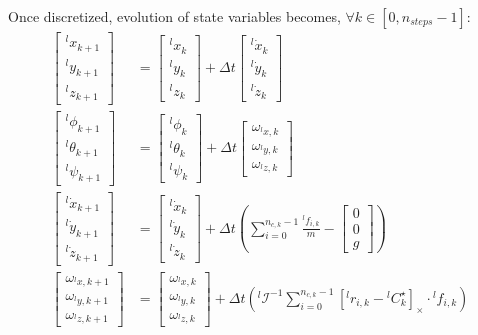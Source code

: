 \documentclass[a4paper,11pt]{article}
\begin{document}
Once discretized, evolution of state variables becomes, $\forall k \in [0, n_{steps}-1]$:
\begin{align}
\begin{bmatrix} {}^l\! x_{k+1} \\ {}^l\! y_{k+1} \\ {}^l\! z_{k+1} \end{bmatrix} &= \begin{bmatrix} {}^l\! x_{k} \\ {}^l\! y_{k} \\ {}^l\! z_{k} \end{bmatrix} + \Delta t \begin{bmatrix} {}^l\! \dot x_{k} \\ {}^l\! \dot y_{k} \\ {}^l\! \dot z_{k} \end{bmatrix} \\
\begin{bmatrix} {}^l\! \phi_{k+1} \\ {}^l\! \theta_{k+1} \\ {}^l\! \psi_{k+1} \end{bmatrix} &= \begin{bmatrix} {}^l\! \phi_{k} \\ {}^l\! \theta_{k} \\ {}^l\! \psi_{k} \end{bmatrix} + \Delta t \begin{bmatrix}  \omega_{{}^l\!x,k} \\  \omega_{{}^l\!y,k} \\ \omega_{{}^l\! z,k} \end{bmatrix} \\
\begin{bmatrix} {}^l\! \dot x_{k+1} \\ {}^l\! \dot y_{k+1} \\ {}^l\! \dot z_{k+1} \end{bmatrix} &= \begin{bmatrix} {}^l\! \dot x_{k} \\ {}^l\! \dot y_{k} \\ {}^l\! \dot z_{k} \end{bmatrix} + \Delta t \left( \sum_{i=0}^{n_{c,k} - 1} \frac{{}^l\!f_{i,k}}{m} - \begin{bmatrix} 0 \\ 0 \\ g \end{bmatrix}  \right) \\
\begin{bmatrix} \omega_{{}^l\!x,k+1} \\  \omega_{{}^l\!y,k+1} \\ \omega_{{}^l\! z,k+1} \end{bmatrix} &= \begin{bmatrix}  \omega_{{}^l\!x,k} \\  \omega_{{}^l\!y,k} \\ \omega_{{}^l\! z,k} \end{bmatrix} + \Delta t \left( {}^l\!\mathcal{I}^{-1}\sum_{i=0}^{n_{c,k} - 1} [{}^l\!r_{i,k} - {}^l\!C_{k}^\star]_\times \cdot {}^l\!f_{i,k}   \right)
\end{align}
\end{document}
